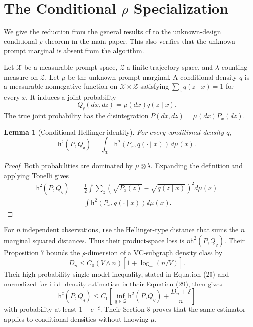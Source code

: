 \documentclass[twoside]{article}
\newtheorem{lemma}[theorem]{Lemma}
\newcommand{\Q}{\mathcal Q}
\newcommand{\h}{\mathsf h}
\begin{document}
\runningauthor{}

\appendix
\section{The Conditional $\rho$ Specialization}
\label{app:rho}

We give the reduction from the general results of \citet{baraud2018} to the unknown-design conditional $\rho$ theorem in the main paper. This also verifies that the unknown prompt marginal is absent from the algorithm.

Let $\mathcal X$ be a measurable prompt space, $\mathcal Z$ a finite trajectory space, and $\lambda$ counting measure on $\mathcal Z$. Let $\mu$ be the unknown prompt marginal. A conditional density $q$ is a measurable nonnegative function on $\mathcal X\times\mathcal Z$ satisfying $\sum_zq(z\mid x)=1$ for every $x$. It induces a joint probability
\[
 Q_q(dx,dz)=\mu(dx)q(z\mid x).
\]
The true joint probability has the disintegration $P(dx,dz)=\mu(dx)P_x(dz)$.

\begin{lemma}[Conditional Hellinger identity]
\label{lem:conditional-h}
For every conditional density $q$,
\[
 \h^2(P,Q_q)=\int_{\mathcal X}\h^2(P_x,q(\cdot\mid x))\,d\mu(x).
\]
\end{lemma}

\begin{proof}
Both probabilities are dominated by $\mu\otimes\lambda$. Expanding the definition and applying Tonelli gives
\begin{align*}
 \h^2(P,Q_q)
 &=\frac12\int\sum_z
 \left(\sqrt{P_x(z)}-\sqrt{q(z\mid x)}\right)^2d\mu(x)\\
 &=\int\h^2(P_x,q(\cdot\mid x))d\mu(x).
\end{align*}
\end{proof}

For $n$ independent observations, \citet{baraud2018} use the Hellinger-type distance that sums the $n$ marginal squared distances. Thus their product-space loss is $n\h^2(P,Q_q)$. Their Proposition 7 bounds the $\rho$-dimension of a VC-subgraph density class by
\begin{equation}
 D_n\leq C_0(V\wedge n)\left[1+\log_+(n/V)\right].
 \label{eq:rho-dimension}
\end{equation}
Their high-probability single-model inequality, stated in Equation (20) and normalized for i.i.d. density estimation in their Equation (29), then gives
\begin{equation}
 \h^2(P,Q_{\widehat q})
 \leq C_1\left[
 \inf_{q\in\Q}\h^2(P,Q_q)+\frac{D_n+\xi}{n}
 \right]
 \label{eq:source-rho}
\end{equation}
with probability at least $1-e^{-\xi}$. Their Section 8 proves that the same estimator applies to conditional densities without knowing $\mu$.
\end{document}
